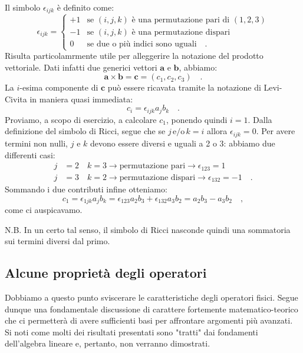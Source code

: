 \begin{approfondimento}[title={Proprietà del simbolo di Levi-Civita}]
    \noindent
Il simbolo $\epsilon_{ijk}$ è definito come:
\begin{equation*}
    \epsilon_{ijk} = \begin{cases} 
    +1 & \text{se } (i,j,k) \text{ è una permutazione pari di } (1,2,3) \\
    -1 & \text{se } (i,j,k) \text{ è una permutazione dispari} \\
    0  & \text{se due o più indici sono uguali} \quad .
    \end{cases}
\end{equation*}
Risulta particolamrmente utile per alleggerire la notazione del prodotto vettoriale. Dati infatti due generici vettori $\bm{a}$ e $\bm{b}$, abbiamo:
\[
    \bm{a} \times \bm{b} = \bm{c} = (c_1, c_2, c_3) \quad.
\]
La $i$-esima componente di $\bm{c}$ può essere ricavata tramite la notazione di Levi-Civita in maniera quasi immediata:
\[
    c_i = \epsilon_{ijk}a_j b_k \quad.
\]
Proviamo, a scopo di esercizio, a calcolare $c_1$, ponendo quindi $i = 1$. Dalla definizione del simbolo di Ricci, segue che se $j \, \text{e/o} \, k = i$ allora $\epsilon_{ijk} = 0$. Per avere termini non nulli, $j$ e $k$ devono essere diversi e uguali a 2 o 3: abbiamo due differenti casi:
\[
    \begin{aligned}
        j &= 2 \quad k = 3 \rightarrow \text{permutazione pari} \rightarrow \epsilon_{123} = 1 \\
        j &= 3 \quad k = 2 \rightarrow \text{permutazione dispari} \rightarrow \epsilon_{132} = -1 \quad.
    \end{aligned}
\]
Sommando i due contributi infine otteniamo:
\[
    c_1 = \epsilon_{1jk}a_jb_k = \epsilon_{123} a_2b_3 + \epsilon_{132}a_3b_2 = a_2b_3 - a_3b_2 \quad,
\]
come ci auspicavamo. 

N.B. In un certo tal senso, il simbolo di Ricci nasconde quindi una sommatoria sui termini diversi dal primo. 
\end{approfondimento}

\subsection{Alcune proprietà degli operatori}
Dobbiamo a questo punto sviscerare le caratteristiche degli operatori fisici. Segue dunque una fondamentale discussione di carattere fortemente matematico-teorico che ci permetterà di avere sufficienti basi per affrontare argomenti più avanzati. Si noti come molti dei risultati presentati sono "tratti" dai fondamenti dell'algebra lineare e, pertanto, non verranno dimostrati.

